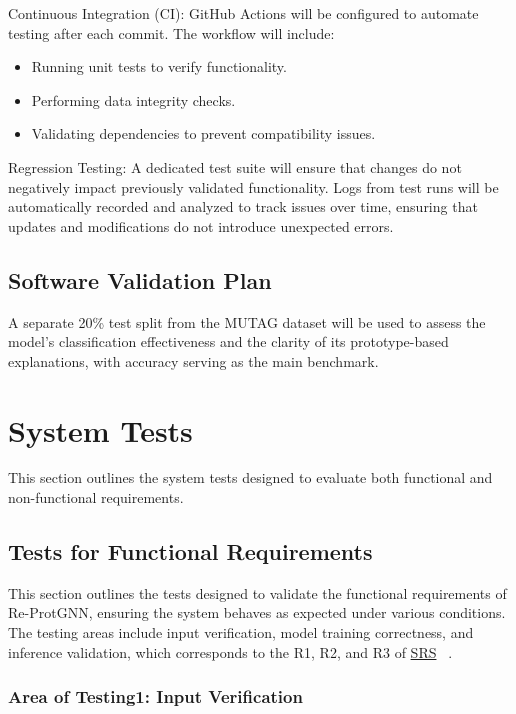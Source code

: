 \documentclass[12pt, titlepage]{article}
\begin{document}
Continuous Integration (CI):
GitHub Actions will be configured to automate testing after each commit. The workflow will include:
\begin{itemize}
    \item Running unit tests to verify functionality.
    \item Performing data integrity checks.
    \item Validating dependencies to prevent compatibility issues.
\end{itemize}

Regression Testing:
A dedicated test suite will ensure that changes do not negatively impact previously validated functionality. Logs from test runs will be automatically recorded and analyzed to track issues over time, ensuring that updates and modifications do not introduce unexpected errors.



\subsection{Software Validation Plan}
\label{sec:svp}
A separate 20\% test split from the MUTAG dataset will be used to assess the model’s classification effectiveness and the clarity of its prototype-based explanations, with accuracy serving as the main benchmark.

\section{System Tests}
\label{sec:system-tests}
This section outlines the system tests designed to evaluate both functional and non-functional requirements.

\subsection{Tests for Functional Requirements}

This section outlines the tests designed to validate the functional requirements of Re-ProtGNN, ensuring the system behaves as expected under various conditions. The testing areas include input verification, model training correctness, and inference validation, which corresponds to the R1, R2, and R3 of \href{https://github.com/Yuanqi-X/Re-ProtGNN/blob/main/docs/SRS/SRS.pdf}{SRS} ~\cite{Yuanqi_ReProtGNN_SRS}.

\subsubsection{Area of Testing1: Input Verification}
\end{document}
